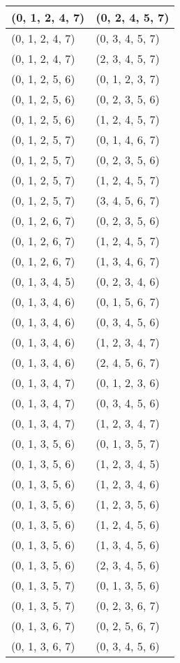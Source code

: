 \begin{footnotesize}
\begin{longtable}[c]{|l|l|}
(0, 1, 2, 4, 7)
&(0, 2, 4, 5, 7)
\\ \hline
(0, 1, 2, 4, 7)
&(0, 3, 4, 5, 7)
\\ \hline
(0, 1, 2, 4, 7)
&(2, 3, 4, 5, 7)
\\ \hline
(0, 1, 2, 5, 6)
&(0, 1, 2, 3, 7)
\\ \hline
(0, 1, 2, 5, 6)
&(0, 2, 3, 5, 6)
\\ \hline
(0, 1, 2, 5, 6)
&(1, 2, 4, 5, 7)
\\ \hline
(0, 1, 2, 5, 7)
&(0, 1, 4, 6, 7)
\\ \hline
(0, 1, 2, 5, 7)
&(0, 2, 3, 5, 6)
\\ \hline
(0, 1, 2, 5, 7)
&(1, 2, 4, 5, 7)
\\ \hline
(0, 1, 2, 5, 7)
&(3, 4, 5, 6, 7)
\\ \hline
(0, 1, 2, 6, 7)
&(0, 2, 3, 5, 6)
\\ \hline
(0, 1, 2, 6, 7)
&(1, 2, 4, 5, 7)
\\ \hline
(0, 1, 2, 6, 7)
&(1, 3, 4, 6, 7)
\\ \hline
(0, 1, 3, 4, 5)
&(0, 2, 3, 4, 6)
\\ \hline
(0, 1, 3, 4, 6)
&(0, 1, 5, 6, 7)
\\ \hline
(0, 1, 3, 4, 6)
&(0, 3, 4, 5, 6)
\\ \hline
(0, 1, 3, 4, 6)
&(1, 2, 3, 4, 7)
\\ \hline
(0, 1, 3, 4, 6)
&(2, 4, 5, 6, 7)
\\ \hline
(0, 1, 3, 4, 7)
&(0, 1, 2, 3, 6)
\\ \hline
(0, 1, 3, 4, 7)
&(0, 3, 4, 5, 6)
\\ \hline
(0, 1, 3, 4, 7)
&(1, 2, 3, 4, 7)
\\ \hline
(0, 1, 3, 5, 6)
&(0, 1, 3, 5, 7)
\\ \hline
(0, 1, 3, 5, 6)
&(1, 2, 3, 4, 5)
\\ \hline
(0, 1, 3, 5, 6)
&(1, 2, 3, 4, 6)
\\ \hline
(0, 1, 3, 5, 6)
&(1, 2, 3, 5, 6)
\\ \hline
(0, 1, 3, 5, 6)
&(1, 2, 4, 5, 6)
\\ \hline
(0, 1, 3, 5, 6)
&(1, 3, 4, 5, 6)
\\ \hline
(0, 1, 3, 5, 6)
&(2, 3, 4, 5, 6)
\\ \hline
(0, 1, 3, 5, 7)
&(0, 1, 3, 5, 6)
\\ \hline
(0, 1, 3, 5, 7)
&(0, 2, 3, 6, 7)
\\ \hline
(0, 1, 3, 6, 7)
&(0, 2, 5, 6, 7)
\\ \hline
(0, 1, 3, 6, 7)
&(0, 3, 4, 5, 6)

\end{longtable}
\end{footnotesize}
